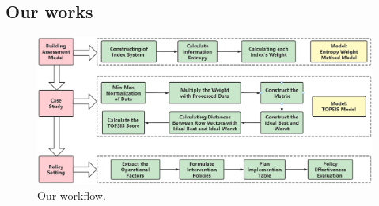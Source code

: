 \subsection{Our works}
    \cite{LBMA}
    \begin{figure}\centering
        \includegraphics[width=1\textwidth]{figures/Flowchart}
        \caption{Our workflow.} \label{fig:figure1}
    \end{figure}




